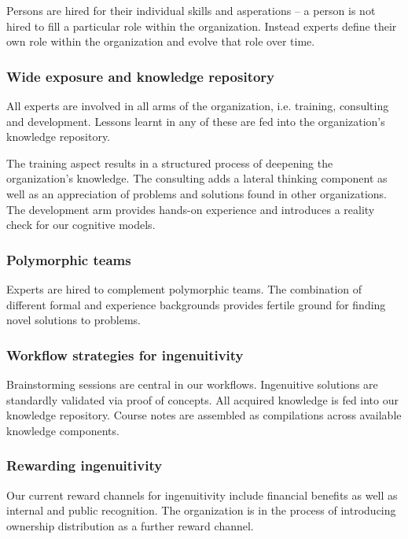 \documentclass[11pt,english,a4]{article}
\begin{document}
Persons are hired for their individual skills and asperations -- a person is not hired to fill a particular role within the organization. Instead experts define their own role within the organization and evolve that role over time.

\subsubsection{Wide exposure and knowledge repository}

All experts are involved in all arms of the organization, i.e. training, consulting and development. Lessons learnt in any of these are fed into the organization's knowledge repository.

The training aspect results in a structured process of deepening the organization's knowledge. The consulting adds a lateral thinking component as well as an appreciation of problems and solutions found in other organizations. The development arm provides hands-on experience and introduces a reality check for our cognitive models.

\subsubsection{Polymorphic teams}

Experts are hired to complement polymorphic teams. The combination of different formal and experience backgrounds provides fertile ground for finding novel solutions to problems.

\subsubsection{Workflow strategies for ingenuitivity}

Brainstorming sessions are central in our workflows. Ingenuitive solutions are standardly validated via proof of concepts. All acquired knowledge is fed into our knowledge repository. Course notes are assembled as compilations across available knowledge components.

\subsubsection{Rewarding ingenuitivity}

Our current reward channels for ingenuitivity include financial benefits as well as internal and public recognition. The organization is in the process of introducing ownership distribution as a further reward channel.
\end{document}
